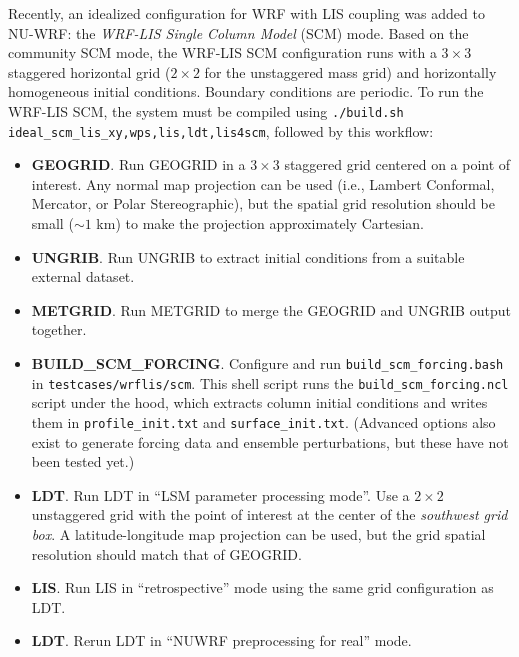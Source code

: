 Recently, an idealized configuration for WRF with LIS coupling was added to
NU-WRF:  the \emph{WRF-LIS Single Column Model} (SCM) mode.  Based on the 
community SCM mode, the WRF-LIS SCM configuration runs with a $3 \times 3$ 
staggered horizontal grid ($2 \times 2$ for the unstaggered mass grid) and 
horizontally homogeneous initial conditions.  Boundary conditions are 
periodic.  To run the WRF-LIS SCM, the system must be compiled using
\texttt{./build.sh ideal\_scm\_lis\_xy,wps,lis,ldt,lis4scm}, followed by this
workflow:

\begin{itemize}

\item \textbf{GEOGRID}.  Run GEOGRID in a $3 \times 3$ staggered grid centered
on a point of interest.  Any normal map projection can be used (i.e., Lambert
Conformal, Mercator, or Polar Stereographic), but the spatial grid resolution
should be small ($\sim1$ km) to make the projection approximately Cartesian.

\item \textbf{UNGRIB}.  Run UNGRIB to extract initial conditions from a 
suitable external dataset.

\item \textbf{METGRID}.  Run METGRID to merge the GEOGRID and UNGRIB output 
together.

\item \textbf{BUILD\_SCM\_FORCING}.  Configure and run 
\texttt{build\_scm\_forcing.bash} in \texttt{testcases/wrflis/scm}.  This
shell script runs the \texttt{build\_scm\_forcing.ncl} script under the hood,
which extracts column initial conditions and writes them in
\texttt{profile\_init.txt} and \texttt{surface\_init.txt}.  (Advanced 
options also exist to generate forcing data and ensemble perturbations, but
these have not been tested yet.)

\item \textbf{LDT}.  Run LDT in ``LSM parameter processing mode''.  Use a
$2 \times 2$ unstaggered grid with the point of interest at the center of the 
\emph{southwest grid box}.  A latitude-longitude map projection can be used,
but the grid spatial resolution should match that of GEOGRID.

\item \textbf{LIS}.  Run LIS in ``retrospective'' mode using the same grid
configuration as LDT.

\item \textbf{LDT}.  Rerun LDT in ``NUWRF preprocessing for real'' mode.


\end{itemize}
